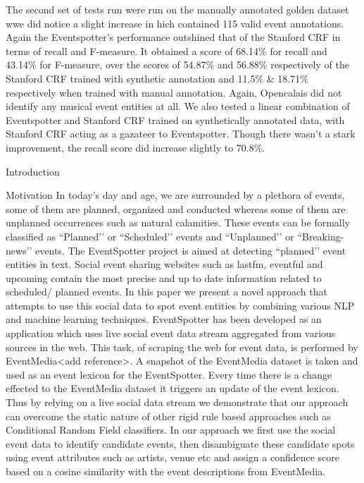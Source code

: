 \documentclass[a4paper,11pt]{report}
\begin{document}
The second set of tests run were run on the manually annotated golden dataset wwe did notice a slight increase in hich contained 115 valid event annotations. Again the Eventspotter's performance outshined that of the Stanford CRF in terms of recall and F-measure. It obtained a score of 68.14\% for recall and 43.14\% for F-measure, over the scores of 54.87\% and 56.88\% respectively of the Stanford CRF trained with synthetic annotation and 11.5\% & 18.71\% respectively when trained with manual annotation. Again, Opencalais did not identify any musical event entities at all. We also tested a linear combination of Eventspotter and Stanford CRF trained on synthetically annotated data, with Stanford CRF acting as a gazateer to Eventspotter. Though there wasn't a stark improvement, the recall score did increase slightly to 70.8\%.
\begin{table}[ht]Introduction

Motivation
In today’s day and age, we are surrounded by a plethora of events, some of them are planned, organized and conducted whereas some of them are unplanned occurrences such as natural calamities. These events can be formally classified as ``Planned’’ or ``Scheduled’’ events and ``Unplanned’’ or ``Breaking-news’’ events. The EventSpotter project is aimed at detecting ``planned’’ event entities in text. Social event sharing websites such as lastfm, eventful and upcoming contain the most precise and up to date information related to scheduled/ planned events. In this paper we present a novel approach that attempts to use this social data to spot event entities by combining various NLP and machine learning techniques. EventSpotter has been developed as an application which uses live social event data stream aggregated from various sources in the web. This task, of scraping the web for event data, is performed by EventMedia<add reference>. A snapshot of the EventMedia dataset is taken and used as an event lexicon for the EventSpotter. Every time there is a change effected to the EventMedia dataset it triggers an update of the event lexicon. Thus by relying on a live social data stream we demonstrate that our approach can overcome the static nature of other rigid rule based approaches such as Conditional Random Field classifiers. In our approach we first use the social event data to identify candidate events, then disambiguate these candidate spots using event attributes such as artists, venue etc and assign a confidence score based on a cosine similarity with the event descriptions from EventMedia. 


\end{table}
\end{document}
